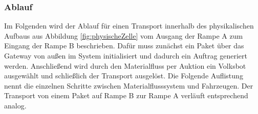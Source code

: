 \subsubsection{Ablauf}

Im Folgenden wird der Ablauf für einen Transport innerhalb des physikalischen Aufbaus aus Abbildung \ref{fig:physischeZelle} vom Ausgang der Rampe A zum Eingang der Rampe B beschrieben. Dafür muss zunächst ein Paket über das Gateway von außen im System initialisiert und dadurch ein Auftrag generiert werden. Anschließend wird durch den Materialfluss per Auktion ein Volksbot ausgewählt und schließlich der Transport ausgelöst. Die Folgende Auflistung nennt die einzelnen Schritte zwischen Materialflusssystem und Fahrzeugen. Der Transport von einem Paket auf Rampe B zur Rampe A verläuft entsprechend analog.

